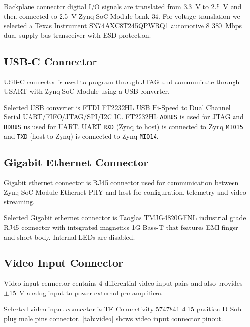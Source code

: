Backplane connector digital I/O signals are translated from \SI{3.3}{\volt} to \SI{2.5}{\volt} and then connected to \SI{2.5}{\volt} Zynq SoC-Module bank 34. For voltage translation we selected a Texas Instrument SN74AXC8T245QPWRQ1 automotive \SI{8}{\bit} \SI{380}{\mega bps} dual-supply bus transceiver with ESD protection.

\subsection{USB-C Connector}

USB-C connector is used to program through JTAG and communicate through USART with Zynq SoC-Module using a USB converter.

Selected USB converter is FTDI FT2232HL USB Hi-Speed to Dual Channel Serial UART/FIFO/JTAG/SPI/I2C IC. FT2232HL \texttt{ADBUS} is used for JTAG and \texttt{BDBUS} us used for UART. UART \texttt{RXD} (Zynq to host) is connected to Zynq \texttt{MIO15} and \texttt{TXD} (host to Zynq) is connected to Zynq \texttt{MIO14}. 

\subsection{Gigabit Ethernet Connector}

Gigabit ethernet connector is RJ45 connector used for communication between Zynq SoC-Module Ethernet PHY and host for configuration, telemetry and video streaming.

Selected Gigabit ethernet connector is Taoglas TMJG4820GENL industrial grade RJ45 connector with integrated magnetics 1G Base-T that features EMI finger and short body. Internal LEDs are disabled. 

\subsection{Video Input Connector}

Video input connector contains 4 differential video input pairs and also provides $\pm$\SI{15}{\volt} analog input to power external pre-amplifiers.

Selected video input connector is TE Connectivity 5747841-4 15-position D-Sub plug male pins connector. \autoref{tab:video} shows video input connector pinout.

